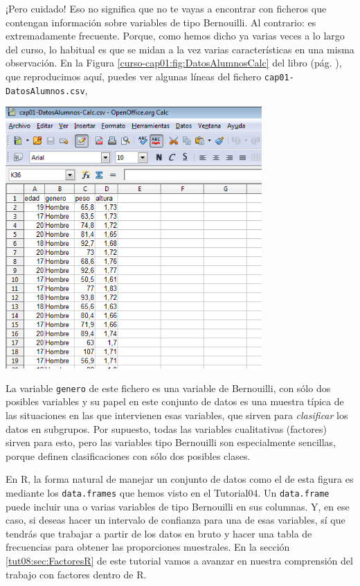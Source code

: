 \documentclass[10pt,a4paper]{article}\usepackage[]{graphicx}\usepackage[]{color}
\newcounter {cont01}
\begin{document}
¡Pero cuidado! Eso no significa que no te vayas a encontrar con ficheros que contengan información sobre variables de tipo Bernouilli. Al contrario: es extremadamente frecuente. Porque, como hemos dicho ya varias veces a lo largo del curso, lo habitual es que se midan a la vez varias características en una misma observación. En la Figura \ref{curso-cap01:fig:DatosAlumnosCalc} del libro (pág. \pageref{curso-cap01:fig:DatosAlumnosCalc}), que reproducimos aquí, puedes ver algunas líneas del fichero {\tt  cap01-DatosAlumnos.csv},

\begin{center}
  \includegraphics[height=10cm]{../fig/Cap01-DatosAlumnos.png}
\end{center}

La variable {\tt genero} de este fichero es una variable de Bernouilli, con sólo dos posibles variables y su papel en este conjunto de datos es una muestra típica de las situaciones en las que intervienen esas variables, que sirven para {\em clasificar} los datos en subgrupos. Por supuesto, todas las variables cualitativas (factores) sirven para esto, pero las variables tipo Bernouilli son especialmente sencillas, porque definen clasificaciones con sólo dos posibles clases.

En R, la forma natural de manejar un conjunto de datos como el de esta figura es mediante los {\tt data.frames} que hemos visto en el Tutorial04. Un {\tt data.frame} puede incluir una o varias variables de tipo Bernouilli en sus columnas. Y, en ese caso, si deseas hacer un intervalo de confianza para una de esas variables, sí que tendrás que trabajar a partir de los datos en bruto y hacer una tabla de frecuencias para obtener las proporciones muestrales. En la sección \ref{tut08:sec:FactoresR} de este tutorial vamos a avanzar en nuestra comprensión del trabajo con factores dentro de R.
\end{document}
